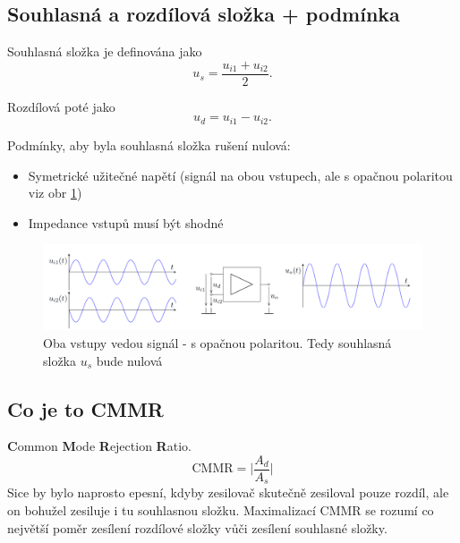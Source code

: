 \documentclass[a4paper,12pt]{article}   %
\begin{document}
\subsection*{Souhlasná a rozdílová složka + podmínka}
Souhlasná složka je definována jako
\begin{equation*}
    u_s = \frac{u_{i1} + u_{i2}}{2}.
\end{equation*}

Rozdílová poté jako
\begin{equation*}
    u_d = u_{i1} - u_{i2}.
\end{equation*}

Podmínky, aby byla souhlasná složka rušení nulová:
\begin{itemize}
    \item Symetrické užitečné napětí (signál na obou vstupech, ale s opačnou polaritou viz obr \ref{fig:rozdilovy:signal})
    \item Impedance vstupů musí být shodné
\end{itemize}

\begin{figure}
    \centering
    \includegraphics[width = \textwidth]{rozdilovy-zesilovac-signal.PNG}
    \caption{Oba vstupy vedou signál - s opačnou polaritou. Tedy souhlasná složka $u_s$ bude nulová}
    \label{fig:rozdilovy:signal}
\end{figure}

\subsection*{Co je to CMMR}
\textbf{C}ommon \textbf{M}ode \textbf{R}ejection \textbf{R}atio.
\begin{equation}
    \text{CMMR} = \lvert\frac{A_d}{A_s}\rvert
\end{equation}
Sice by bylo naprosto epesní, kdyby zesilovač skutečně zesiloval pouze rozdíl, ale on bohužel zesiluje i tu souhlasnou složku. Maximalizací CMMR se rozumí co největší poměr zesílení rozdílové složky vůči zesílení souhlasné složky.
\end{document}
